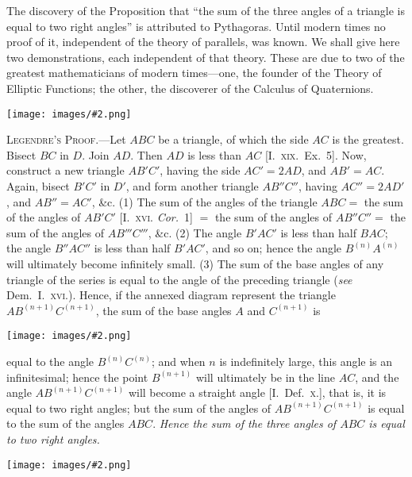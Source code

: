 \documentclass[oneside]{book}
\newcommand\imgcent[2]{
\begin{center}
\texttt{[image: images/\#2.png]}
\end{center}
}
\begin{document}
\begin{footnotesize}
The discovery of the Proposition that ``the sum of the three
angles of a triangle is equal to two right angles'' is attributed to
Pythagoras. Until modern times no proof of it, independent of
the theory of parallels, was known. We shall give here two
demonstrations, each independent of that theory. These are due
to two of the greatest mathematicians of modern times---one, the
founder of the Theory of Elliptic Functions; the other, the discoverer
of the Calculus of Quaternions.

\imgcent{268}{f260}

\textsc{Legendre's Proof.}---Let $ABC$ be a triangle, of which the
side $AC$ is the greatest. Bisect $BC$ in $D$. Join $AD$. Then $AD$ is
less than $AC$ [I.~\textsc{xix.}\ Ex.~5]. Now, construct a new triangle
$AB'C'$, having the side $AC' = 2AD$, and $AB' = AC$. Again, bisect
$B'C'$ in $D'$, and form another triangle $AB''C''$, having $AC'' = 2AD'$,
and $AB'' = AC'$, \&c. (1) The sum of the angles of the triangle $ABC
=$ the sum of the angles of $AB'C'$ [I.~\textsc{xvi.} \emph{Cor.}~1] $=$ the sum of the
angles of $AB''C'' =$ the sum of the angles of $AB'''C'''$, \&c. (2) The
angle $B'AC'$ is less than half $BAC$; the angle $B''AC''$ is less than
half $B'AC'$, and so on; hence the angle $B^{(n)} A^{(n)}$ will ultimately
become infinitely small. (3) The sum of the base angles of any
triangle of the series is equal to the angle of the preceding triangle
(\emph{see} Dem.\ I.~\textsc{xvi.}). Hence, if the annexed diagram
represent the triangle $AB^{(n+1)}C^{(n+1)}$,
the sum of the base angles $A$ and $C^{(n+1)}$ is
\imgcent{278}{f261}
equal to the angle $B^{(n)}C^{(n)}$; and when $n$ is indefinitely large, this
angle is an infinitesimal; hence the point $B^{(n+1)}$ will ultimately be
in the line $AC$, and the angle $AB^{(n+1)}C^{(n+1)}$ will become a straight
angle [I.~Def.\ \textsc{x.}], that is, it is equal to two right angles; but the
sum of the angles of $AB^{(n+1)}C^{(n+1)}$ is equal to the sum of the
angles $ABC$. \emph{Hence the sum of the three angles of $ABC$ is equal
to two right angles.}

\imgcent{215}{f249}


\end{footnotesize}
\end{document}
